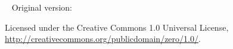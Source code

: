 \documentclass{tex/tufte-book} %
\title[Notes on Star Formation]{%
\setlength{\parindent}{0pt}%
Notes on\par%
Star Formation%
\par \vspace{1cm}%
\usebox{\coverimage}%
} %
\author{Mark R.~Krumholz} %
\newcommand{\monthyear}{\ifcase\month\or January\or February\or March\or April\or May\or June\or July\or August\or September\or October\or November\or December\fi\space\number\year} %
\newcommand{\openepigraph}[2]{ %
\begin{fullwidth}
\sffamily\large
\begin{doublespace}
\noindent\allcaps{#1}\\ %
\noindent\allcaps{#2} %
\end{doublespace}
\end{fullwidth}
}
\begin{document}
\frontmatter


\thispagestyle{empty}


\maketitle %


\newpage
\begin{fullwidth}
~\vfill
\thispagestyle{empty}
\setlength{\parindent}{0pt}
\setlength{\parskip}{\baselineskip}
Original version: \the\year\ \thanklessauthor

\par{}

\par{}

\par Licensed under the Creative Commons 1.0 Universal License, \url{http://creativecommons.org/publicdomain/zero/1.0/}.

\end{fullwidth}


\setcounter{tocdepth}{1}
\tableofcontents %


\listoffigures %

\end{document}

